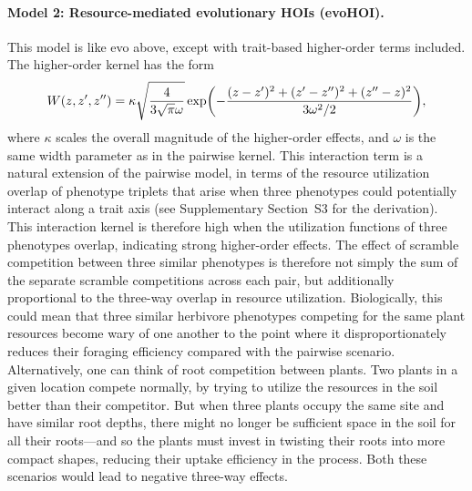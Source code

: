 \documentclass[11pt]{article}
\newcommand{\SI}{Supplementary}
\let\originalleft\left
\let\originalright\right
\renewcommand{\left}{\mathopen{}\mathclose\bgroup\originalleft}
\renewcommand{\right}{\aftergroup\egroup\originalright}
\begin{document}
\paragraph{Model 2: Resource-mediated evolutionary HOIs (evoHOI).} This model is like evo above, except with trait-based higher-order terms included. The higher-order kernel has the form
\begin{equation}
  \label{eq:evoHOI-kernel}
  W(z,z',z'') = \kappa \sqrt{\frac{4}{3 \sqrt{\pi} \omega}} \exp \left(-\frac{(z-z')^2+(z'-z'')^2+(z''-z)^2}{3 \omega^2 / 2}\right),
\end{equation}
where $\kappa$ scales the overall magnitude of the higher-order effects, and $\omega$ is the same width parameter as in the pairwise kernel. This interaction term is a natural extension of the pairwise model, in terms of the resource utilization overlap of phenotype triplets that arise when three phenotypes could potentially interact along a trait axis (see \SI{} Section~S3 for the derivation). This interaction kernel is therefore high when the utilization functions of three phenotypes overlap, indicating strong higher-order effects. The effect of scramble competition between three similar phenotypes is therefore not simply the sum of the separate scramble competitions across each pair, but additionally proportional to the three-way overlap in resource utilization. Biologically, this could mean that three similar herbivore phenotypes competing for the same plant resources become wary of one another to the point where it disproportionately reduces their foraging efficiency compared with the pairwise scenario. Alternatively, one can think of root competition between plants. Two plants in a given location compete normally, by trying to utilize the resources in the soil better than their competitor. But when three plants occupy the same site and have similar root depths, there might no longer be sufficient space in the soil for all their roots---and so the plants must invest in twisting their roots into more compact shapes, reducing their uptake efficiency in the process. Both these scenarios would lead to negative three-way effects.
\end{document}
